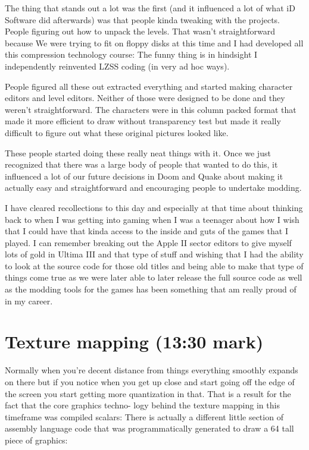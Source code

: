 \documentclass[book.tex]{subfiles}
\begin{document}
The thing that stands out a lot was the first (and it influenced a lot
of what iD Software did afterwards) was that people kinda tweaking with
the projects. People figuring out how to unpack the levels. That 
wasn't straightforward because We were trying to fit on floppy disks 
at this time and I had developed all this compression technology course:
The funny thing is in hindsight I independently reinvented LZSS coding 
(in very ad hoc ways). \\
\par
People figured all these out extracted everything and started making 
character editors and  level editors. Neither of those were designed 
to be done and they weren't straightforward. The characters were in 
this column packed format that made it more efficient to draw without 
transparency test but made it really difficult to figure out what 
these original pictures looked like. \\
\par
These people started doing these really neat things with it. Once we 
just recognized that there was a large body of people that wanted to 
do this, it influenced a lot of our future decisions in Doom and Quake 
about making it actually easy and straightforward and encouraging 
people to undertake modding.\\
\par
I have cleared recollections to this day and especially at that time 
about thinking back to when I was getting into gaming when I was a 
teenager about how I wish that I could have that kinda access to the 
inside and guts of the games that I played. I can remember breaking 
out the Apple II sector editors to give myself lots of gold in 
Ultima III and that type of stuff and wishing that I had the ability 
to look at the source code for those old titles and being able to 
make that type of things come true as we were later able to later 
release  the full source code as well as the modding tools for the 
games has been something that am really proud of in my career.\\




\section{Texture mapping (13:30 mark)}


Normally when you're decent distance from things everything smoothly 
expands on there but if you notice when you get up close and start 
going off the edge of the screen you start getting more quantization 
in that. That is a result for the fact that the core graphics techno-
logy behind the texture mapping in this timeframe was compiled 
scalars: There is actually a different little section of assembly 
language code that was programmatically generated to draw a 64 tall 
piece of graphics:\\
\end{document}
